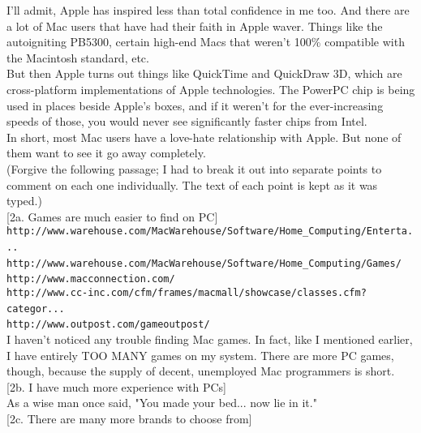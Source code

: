 \documentclass[11pt,twoside,a4paper]{article}
\begin{document}
\begin{multicols*}{2}
I'll admit, Apple has inspired less than total confidence in me too. And there are a lot of Mac users that have had their faith in Apple waver. Things like the autoigniting PB5300, certain high-end Macs that weren't 100\% compatible with the Macintosh standard, etc.~\\

But then Apple turns out things like QuickTime and QuickDraw 3D, which are cross-platform implementations of Apple technologies. The PowerPC chip is being used in places beside Apple's boxes, and if it weren't for the ever-increasing speeds of those, you would never see significantly faster chips from Intel.~\\

In short, most Mac users have a love-hate relationship with Apple. But none of them want to see it go away completely.~\\

(Forgive the following passage; I had to break it out into separate points to comment on each one individually. The text of each point is kept as it was typed.)~\\

[2a. Games are much easier to find on PC]~\\

\texttt{http://www.warehouse.com/MacWarehouse/Software/Home\_Computing/Enterta...}~\\
\texttt{http://www.warehouse.com/MacWarehouse/Software/Home\_Computing/Games/}~\\
\texttt{http://www.macconnection.com/}~\\
\texttt{http://www.cc-inc.com/cfm/frames/macmall/showcase/classes.cfm?categor...}~\\
\texttt{http://www.outpost.com/gameoutpost/}~\\

I haven't noticed any trouble finding Mac games. In fact, like I mentioned earlier, I have entirely TOO MANY games on my system. There are more PC games, though, because the supply of decent, unemployed Mac programmers is short.~\\

[2b. I have much more experience with PCs]~\\

As a wise man once said, "You made your bed... now lie in it."~\\

[2c. There are many more brands to choose from]~\\


\end{multicols*}
\end{document}
